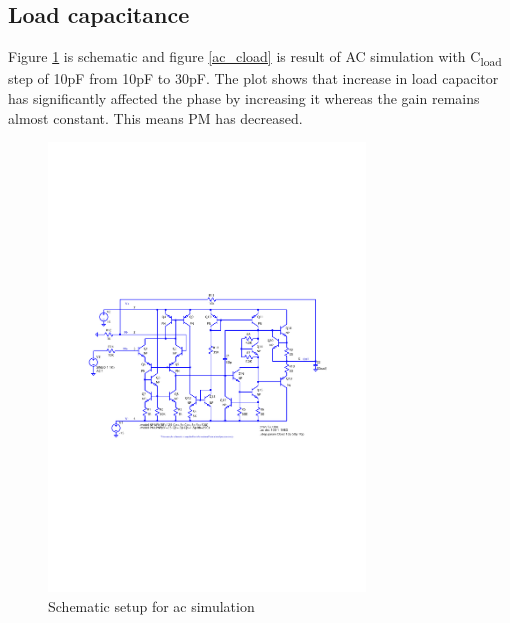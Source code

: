 \documentclass[12pt,a4paper,UKenglish]{article}
\begin{document}
\subsection{Load capacitance }
 Figure \ref{sch_1d}  is schematic and figure \ref{ac_cload} is  result of  AC simulation with C\textsubscript{load} step of 10pF from 10pF to 30pF. The plot shows that increase in load capacitor has significantly affected the phase by increasing it whereas the gain remains almost constant. This means PM has decreased. 
\begin{figure} [H]
  \centering 
  \includegraphics[width=0.75\textwidth]{img/sch_1d.pdf} 
  \caption{Schematic setup for ac simulation}
  \label{sch_1d} 
\end{figure}
\end{document}
